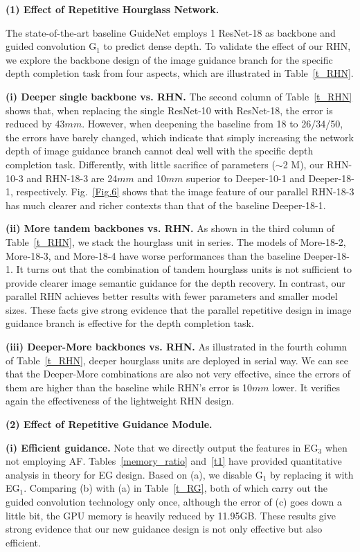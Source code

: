 \documentclass[runningheads]{llncs}
\begin{document}
\noindent \textbf{(1) Effect of Repetitive Hourglass Network.}

The state-of-the-art baseline GuideNet \cite{tang2020learning} employs 1 ResNet-18 as backbone and guided convolution G$_1$ to predict dense depth. To validate the effect of our RHN, we explore the backbone design of the image guidance branch for the specific depth completion task from four aspects, which are illustrated in Table~\ref{t_RHN}.

\textbf{(i) Deeper single backbone vs. RHN.} The second column of Table~\ref{t_RHN} shows that, when replacing the single ResNet-10 with ResNet-18, the error is reduced by 43$mm$. However, when deepening the baseline from 18 to 26/34/50, the errors have barely changed, which indicate that simply increasing the network depth of image guidance branch cannot deal well with the specific depth completion task. Differently, with little sacrifice of parameters ($\sim$2 M), our RHN-10-3 and RHN-18-3 are 24$mm$ and 10$mm$ superior to Deeper-10-1 and Deeper-18-1, respectively. Fig.~\ref{Fig.6} shows that the image feature of our parallel RHN-18-3 has much clearer and richer contexts than that of the baseline Deeper-18-1.

\textbf{(ii) More tandem backbones vs. RHN.} As shown in the third column of Table~\ref{t_RHN}, we stack the hourglass unit in series. The models of More-18-2, More-18-3, and More-18-4 have worse performances than the baseline Deeper-18-1. It turns out that the combination of tandem hourglass units is not sufficient to provide clearer image semantic guidance for the depth recovery. In contrast, our parallel RHN achieves better results with fewer parameters and smaller model sizes. These facts give strong evidence that the parallel repetitive design in image guidance branch is effective for the depth completion task.

\textbf{(iii) Deeper-More backbones vs. RHN.} As illustrated in the fourth column of Table~\ref{t_RHN}, deeper hourglass units are deployed in serial way. We can see that the Deeper-More combinations are also not very effective, since the errors of them are higher than the baseline while RHN's error is 10$mm$ lower. It verifies again the effectiveness of the lightweight RHN design. 

\noindent \textbf{(2) Effect of Repetitive Guidance Module.}

\textbf{(i) Efficient guidance.} Note that we directly output the features in EG$_{3}$ when not employing AF. Tables~\ref{memory_ratio} and~\ref{t1} have provided quantitative analysis in theory for EG design. Based on (a), we disable G$_1$ by replacing it with EG$_{1}$. Comparing (b) with (a) in Table~\ref{t_RG}, both of which carry out the guided convolution technology only once, although the error of (c) goes down a little bit, the GPU memory is heavily reduced by 11.95GB. These results give strong evidence that our new guidance design is not only effective but also efficient.
\end{document}
